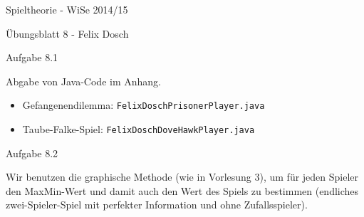 \documentclass{scrartcl}
\begin{document}
\begin{LARGE}
Spieltheorie - WiSe 2014/15
\end{LARGE}

\begin{Large}
Übungsblatt 8 - Felix Dosch\\[1.0cm]
\end{Large}

\begin{Large}
Aufgabe 8.1\\[0.0cm]
\end{Large}

Abgabe von Java-Code im Anhang.

\begin{itemize}
\item{Gefangenendilemma:  \texttt{FelixDoschPrisonerPlayer.java}}
\end{itemize}
\begin{itemize}
\item{Taube-Falke-Spiel:  \texttt{FelixDoschDoveHawkPlayer.java}}
\end{itemize}

\begin{Large}
Aufgabe 8.2\\[0.0cm]
\end{Large}

Wir benutzen die graphische Methode (wie in Vorlesung 3), um für jeden Spieler den MaxMin-Wert und
damit auch den Wert des Spiels zu bestimmen (endliches zwei-Spieler-Spiel mit perfekter Information
und ohne Zufallsspieler). \\
\end{document}
